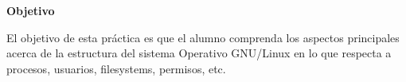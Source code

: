 \documentclass[a4paper,11pt]{exam}
\begin{document}
\maketitle

\textbf{Objetivo}

El objetivo de esta práctica es que el alumno comprenda los aspectos principales acerca de la estructura del sistema Operativo GNU/Linux en lo que respecta a procesos, usuarios, filesystems, permisos, etc.


\end{document}
